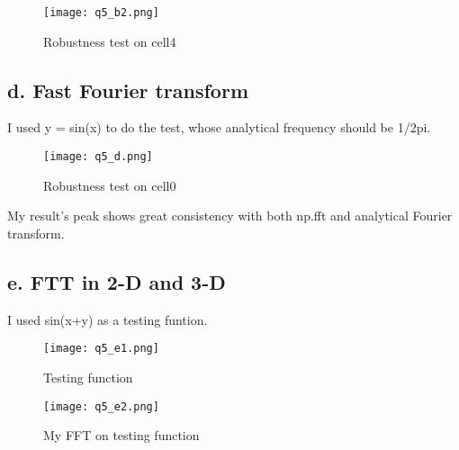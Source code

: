 \begin{figure}[h!]
  \centering
  \texttt{[image: q5\_b2.png]}
  \caption{Robustness test on cell4}
  \label{fig:cell4}
\end{figure}


\subsection{d. Fast Fourier transform}


I used y = sin(x) to do the test, whose analytical frequency should be 1/2pi.

\begin{figure}[h!]
  \centering
  \texttt{[image: q5\_d.png]}
  \caption{Robustness test on cell0}
  \label{fig:FFT_1D}
\end{figure}

My result's peak shows great consistency with both np.fft and analytical Fourier transform.


\subsection{e. FTT in 2-D and 3-D}



I used sin(x+y) as a testing funtion.

\begin{figure}[h!]
  \centering
  \texttt{[image: q5\_e1.png]}
  \caption{Testing function}
  \label{fig:FFT_2D_fun}
\end{figure}


\begin{figure}[h!]
  \centering
  \texttt{[image: q5\_e2.png]}
  \caption{My FFT on testing function}
  \label{fig:FFT_2D}
\end{figure}